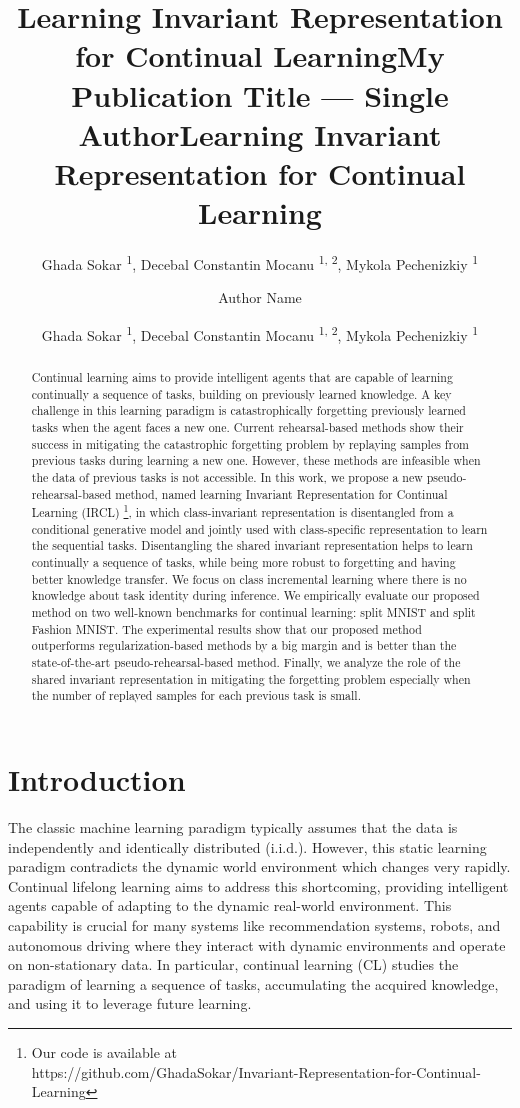 \documentclass[letterpaper]{article} %
\title{Learning Invariant Representation for Continual Learning}
\author{
    Ghada Sokar \textsuperscript{\rm 1},
    Decebal Constantin Mocanu \textsuperscript{\rm 1, \rm 2},
    Mykola Pechenizkiy \textsuperscript{\rm 1} \\
}
\title{My Publication Title --- Single Author}
\author {
    Author Name \\
}
\title{Learning Invariant Representation for Continual Learning}
\author {
    Ghada Sokar \textsuperscript{\rm 1},
    Decebal Constantin Mocanu \textsuperscript{\rm 1, \rm 2},
    Mykola Pechenizkiy \textsuperscript{\rm 1} \\
}
\begin{document}
\maketitle

\begin{abstract}
Continual learning aims to provide intelligent agents that are capable of learning continually a sequence of tasks, building on previously learned knowledge.
A key challenge in this learning paradigm is catastrophically forgetting previously learned tasks when the agent faces a new one. Current rehearsal-based methods show their success in mitigating the catastrophic forgetting problem by replaying samples from previous tasks during learning a new one. However, these methods are infeasible when the data of previous tasks is not accessible. In this work, we propose a new pseudo-rehearsal-based method, named learning Invariant Representation for Continual Learning (IRCL) \footnote{Our code is available at\\ https://github.com/GhadaSokar/Invariant-Representation-for-Continual-Learning}, in which class-invariant representation is disentangled from a conditional generative model and jointly used with class-specific representation to learn the sequential tasks. Disentangling the shared invariant representation helps to learn continually a sequence of tasks, while being more robust to forgetting and having better knowledge transfer. We focus on class incremental learning where there is no knowledge about task identity during inference. We empirically evaluate our proposed method on two well-known benchmarks for continual learning: split MNIST and split Fashion MNIST. The experimental results show that our proposed method outperforms regularization-based methods by a big margin and is better than the state-of-the-art pseudo-rehearsal-based method. Finally, we analyze the role of the shared invariant representation in mitigating the forgetting problem especially when the number of replayed samples for each previous task is small.  
\end{abstract}

\section{Introduction}
 The classic machine learning paradigm typically assumes that the data is independently and identically distributed (i.i.d.). However, this static learning paradigm contradicts the dynamic world environment which changes very rapidly. Continual lifelong learning aims to address this shortcoming, providing intelligent agents capable of adapting to the dynamic real-world environment. This capability is crucial for many systems like recommendation systems, robots, and autonomous driving where they interact with dynamic environments and operate on non-stationary data. In particular, continual learning (CL) studies the paradigm of learning a sequence of tasks, accumulating the acquired knowledge, and using it to leverage future learning.
\end{document}
